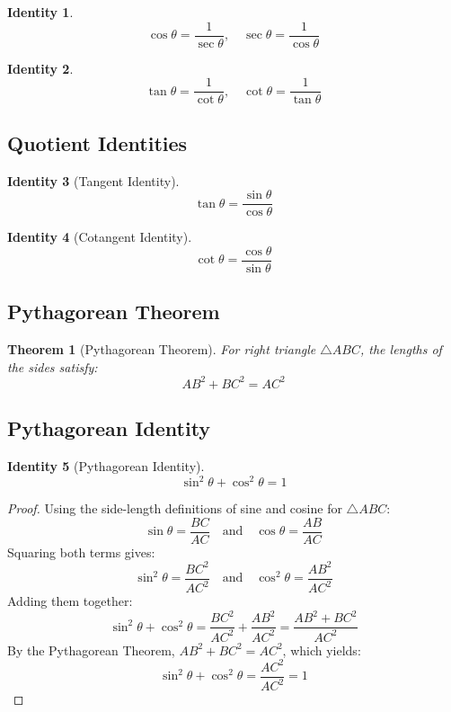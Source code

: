 \documentclass{article}
\theoremstyle{definition}
\theoremstyle{plain}
\newtheorem{theorem}{Theorem}[]
\newtheorem{identity}{Identity}[]
\begin{document}
\begin{identity}
    \[
    \cos \theta = \frac{1}{\sec \theta}, \quad \sec \theta = \frac{1}{\cos \theta}
    \]
\end{identity}

\begin{identity}
    \[
    \tan \theta = \frac{1}{\cot \theta}, \quad \cot \theta = \frac{1}{\tan \theta}
    \]
\end{identity}

\subsection{Quotient Identities}

\begin{identity}[Tangent Identity]
    \[
    \tan \theta = \frac{\sin \theta}{\cos \theta}
    \]
\end{identity}

\begin{identity}[Cotangent Identity]
    \[
    \cot \theta = \frac{\cos \theta}{\sin \theta}
    \]
\end{identity}

\subsection{Pythagorean Theorem}

\begin{theorem}[Pythagorean Theorem]
    For right triangle $\triangle ABC$, the lengths of the sides satisfy:
    \[
    AB^2 + BC^2 = AC^2
    \]
\end{theorem}

\subsection{Pythagorean Identity}

\begin{identity}[Pythagorean Identity]
    \[
    \sin^2 \theta + \cos^2 \theta = 1
    \]
\end{identity}
\begin{proof}
    Using the side-length definitions of sine and cosine for $\triangle ABC$:
    \[
    \sin \theta = \frac{BC}{AC} \quad \text{and} \quad \cos \theta = \frac{AB}{AC}
    \]
    Squaring both terms gives:
    \[
    \sin^2 \theta = \frac{BC^2}{AC^2} \quad \text{and} \quad \cos^2 \theta = \frac{AB^2}{AC^2}
    \]
    Adding them together:
    \[
    \sin^2 \theta + \cos^2 \theta = \frac{BC^2}{AC^2} + \frac{AB^2}{AC^2} = \frac{AB^2 + BC^2}{AC^2}
    \]
    By the Pythagorean Theorem, $AB^2 + BC^2 = AC^2$, which yields:
    \[
    \sin^2 \theta + \cos^2 \theta = \frac{AC^2}{AC^2} = 1
    \]
\end{proof}
\end{document}

